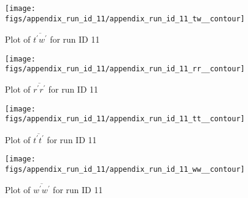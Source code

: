 \begin{figure}[H]
\centering
\texttt{[image: figs/appendix\_run\_id\_11/appendix\_run\_id\_11\_tw\_\_contour]}
\caption{Plot of $\overline{t^\prime w^\prime}$ for run ID 11}
\label{fig:appendix_run_id_11_tw__contour}
\end{figure}


\begin{figure}[H]
\centering
\texttt{[image: figs/appendix\_run\_id\_11/appendix\_run\_id\_11\_rr\_\_contour]}
\caption{Plot of $\overline{r^\prime r^\prime}$ for run ID 11}
\label{fig:appendix_run_id_11_rr__contour}
\end{figure}


\begin{figure}[H]
\centering
\texttt{[image: figs/appendix\_run\_id\_11/appendix\_run\_id\_11\_tt\_\_contour]}
\caption{Plot of $\overline{t^\prime t^\prime}$ for run ID 11}
\label{fig:appendix_run_id_11_tt__contour}
\end{figure}


\begin{figure}[H]
\centering
\texttt{[image: figs/appendix\_run\_id\_11/appendix\_run\_id\_11\_ww\_\_contour]}
\caption{Plot of $\overline{w^\prime w^\prime}$ for run ID 11}
\label{fig:appendix_run_id_11_ww__contour}
\end{figure}


